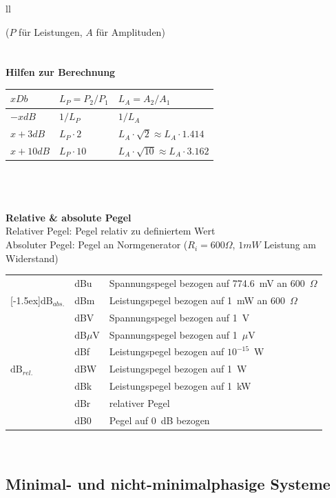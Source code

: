 \begin{tabular}{ll}
{\small{($P$ für Leistungen, $A$ für Amplituden)}
\\ \\ \\

\textbf{Hilfen zur Berechnung}\\
\begin{tabular}{|l|ll|}
\hline
$x Db$	& $L_P=P_2/P_1$ &$L_A=A_2/A_1$ \\
\hline
$-x dB$	& $1/L_P$	& $1/L_A$\\
$x+3dB$	& $L_P \cdot 2$	& $L_A \cdot \sqrt{2} \approx L_A \cdot 1.414$ \\
$x+10dB$	& $L_P \cdot 10$ & $L_A \cdot \sqrt{10} \approx L_A \cdot 3.162$\\
\hline
\end{tabular}
\\ \\ \\

\textbf{Relative \& absolute Pegel}\\
Relativer Pegel: Pegel relativ zu definiertem Wert\\
Absoluter Pegel: Pegel an Normgenerator ($R_i = 600 \Omega$, $1mW$ Leistung am
Widerstand)\\ 
\begin{tabular}{|l|l|l|}\hline
  & dBu & Spannungspegel bezogen auf 774.6~mV an 600~$\Omega$\\ \cline{2-3}
 \multicolumn{1}{|l|}{\raisebox{1.5ex}[-1.5ex]{$\mbox{dB}_{abs.}$}} & dBm & Leistungspegel bezogen auf 1~mW an 600~$\Omega$\\ \hline\hline
  & dBV & Spannungspegel bezogen auf 1~V\\ \cline{2-3}
  & dB$\mu$V & Spannungspegel bezogen auf 1~$\mu$V\\ \cline{2-3}
  & dBf & Leistungspegel bezogen auf $10^{-15}$~W\\ \cline{2-3} 
\multicolumn{1}{|l|}{$\mbox{dB}_{rel.}$}  & dBW & Leistungspegel bezogen auf 1~W\\ \cline{2-3}
  & dBk & Leistungspegel bezogen auf 1~kW\\ \cline{2-3}
  & dBr & relativer Pegel\\ \cline{2-3}
  & dB0 & Pegel auf 0~dB bezogen\\ \hline
\end{tabular}\\

}
\end{tabular}
\newpage

\subsection{Minimal- und nicht-minimalphasige Systeme}
